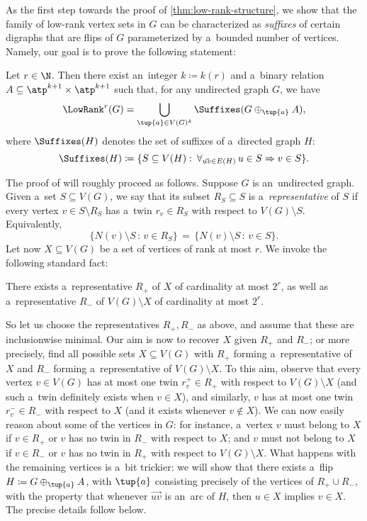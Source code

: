 As the first step towards the proof of \cref{thm:low-rank-structure}, we show that the family of low-rank vertex sets in $G$ can be characterized as \emph{suffixes} of certain digraphs that are flips of $G$ parameterized by a~bounded number of vertices.
Namely, our goal is to prove the following statement:

\begin{lemma}
    \label{lem:low-rank-to-suffixes}
    Let $r \in \N$.
    Then there exist an~integer $k \coloneqq k(r)$ and a~binary relation $A \subseteq \atp^{k+1} \times \atp^{k+1}$ such that, for any undirected graph $G$, we have
    \[
        \LowRank^r(G) = \bigcup_{\tup{a} \in V(G)^k} \Suffixes(G \oplus_{\tup{a}} A),
    \]
    where $\Suffixes(H)$ denotes the set of suffixes of a~directed graph $H$: \[\Suffixes(H) \coloneqq \{S \subseteq V(H) \,\colon\, \forall_{\vec{uv} \in E(H)}\, u \in S \Rightarrow v \in S\}.\]
\end{lemma}

The proof of  will roughly proceed as follows.
Suppose $G$ is an~undirected graph.
Given a~set $S \subseteq V(G)$, we say that its subset $R_S \subseteq S$ is a~\emph{representative} of $S$ if every vertex $v \in S \setminus R_S$ has a~twin $r_v \in R_S$ with respect to $V(G) \setminus S$.
Equivalently,
\[
    \{ N(v) \setminus S \,\colon\, v \in R_S \} \,=\, \{ N(v) \setminus S \,\colon\, v \in S \}.
\]
Let now $X \subseteq V(G)$ be a set of vertices of rank at most $r$.
We invoke the following standard fact:
\begin{proposition}
    \label{prop:small-representative}
    There exists a~representative $R_+$ of $X$ of cardinality at most $2^r$, as well as a~representative $R_-$ of $V(G) \setminus X$ of cardinality at most $2^r$.
\end{proposition}
So let us choose the representatives $R_+, R_-$ as above, and assume that these are inclusionwise minimal.
Our aim is now to recover $X$ given $R_+$ and $R_-$; or more precisely, find all possible sets $X \subseteq V(G)$ with $R_+$ forming a~representative of $X$ and $R_-$ forming a~representative of $V(G) \setminus X$.
To this aim, observe that every vertex $v \in V(G)$ has at most one twin $r_v^+ \in R_+$ with respect to $V(G) \setminus X$ (and such a~twin definitely exists when $v \in X$), and similarly, $v$ has at most one twin $r_v^- \in R_-$ with respect to $X$ (and it exists whenever $v \notin X$).
We can now easily reason about some of the vertices in $G$: for instance, a~vertex $v$ must belong to $X$ if $v \in R_+$ or $v$ has no twin in $R_-$ with respect to $X$; and $v$ must not belong to $X$ if $v \in R_-$ or $v$ has no twin in $R_+$ with respect to $V(G) \setminus X$.
What happens with the remaining vertices is a~bit trickier: we will show that there exists a~flip $H \coloneqq G \oplus_{\tup{a}} A$, with $\tup{a}$ consisting precisely of the vertices of $R_+ \cup R_-$, with the property that whenever $\vec{uv}$ is an~arc of $H$, then $u \in X$ implies $v \in X$.
The precise details follow below.

